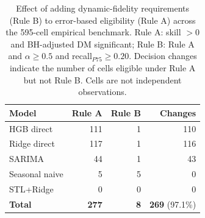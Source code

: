 \begin{table}[ht]
\centering
\caption{Effect of adding dynamic-fidelity requirements (Rule B) to
error-based eligibility (Rule A) across the 595-cell empirical benchmark.
Rule A: skill $>0$ and BH-adjusted DM significant; Rule B: Rule A and
$\alpha\geq0.5$ and recall$_{P75}\geq0.20$. Decision changes indicate the
number of cells eligible under Rule A but not Rule B. Cells are not
independent observations.}
\label{tab:decision_rule}
\begin{tabular}{lrrr}
\toprule
Model & Rule A & Rule B & Changes \\
\midrule
HGB direct & 111 & 1 & 110 \\
Ridge direct & 117 & 1 & 116 \\
SARIMA & 44 & 1 & 43 \\
Seasonal naive & 5 & 5 & 0 \\
STL+Ridge & 0 & 0 & 0 \\
\midrule
\textbf{Total} & \textbf{277} & \textbf{8} & \textbf{269} (97.1\%) \\
\bottomrule
\end{tabular}
\end{table}
